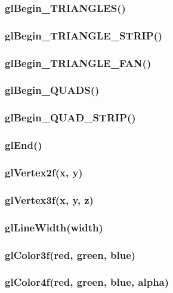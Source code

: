 \documentclass[11pt,parskip=half,a4paper]{scrartcl}
\begin{document}
\subsubsection{glBegin\_TRIANGLES()}

\subsubsection{glBegin\_TRIANGLE\_STRIP()}

\subsubsection{glBegin\_TRIANGLE\_FAN()}

\subsubsection{glBegin\_QUADS()}

\subsubsection{glBegin\_QUAD\_STRIP()}

\subsubsection{glEnd()}

\subsubsection{glVertex2f(x, y)}

\subsubsection{glVertex3f(x, y, z)}

\newpage

\subsubsection{glLineWidth(width)}

\subsubsection{glColor3f(red, green, blue)}

\subsubsection{glColor4f(red, green, blue, alpha)}
\end{document}
